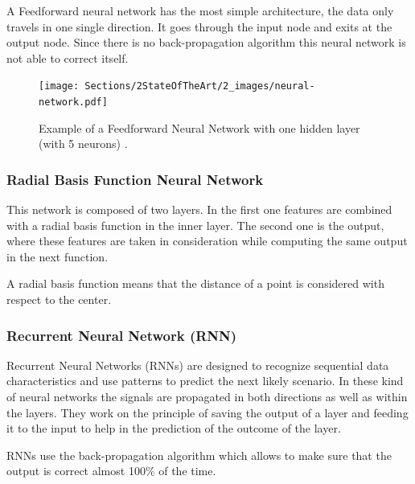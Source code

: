             \par A Feedforward neural network has the most simple architecture, the data only travels in one single direction. It goes through the input node and exits at the output node. Since there is no back-propagation algorithm this neural network is not able to correct itself. \cite{ArmaanMerchant2018} \cite{VikasGupta2017}

            \begin{figure}[htb]
                \centering
                \texttt{[image: Sections/2StateOfTheArt/2\_images/neural-network.pdf]}
                \caption{ Example of a Feedforward Neural Network with one hidden layer (with 5 neurons) \cite{neural_image}. }  
            \end{figure}

            \newpage
            \subsubsection{Radial Basis Function Neural Network}

            \par This network is composed of two layers. In the first one features are combined with a radial basis function in the inner layer. The second one is the output, where these features are taken in consideration while computing the same output in the next function.
            \par A radial basis function means that the distance of a point is considered with respect to the center. \cite{ArmaanMerchant2018}


            \subsubsection{Recurrent Neural Network (RNN)} 

            \par Recurrent Neural Networks (RNNs) are designed to recognize sequential data characteristics and use patterns to predict the next likely scenario. In these kind of neural networks the signals are propagated in both directions as well as within the layers. They work on the principle of saving the output of a layer and feeding it to the input to help in the prediction of the outcome of the layer.
            \par RNNs use the back-propagation algorithm which allows to make sure that the output is correct almost 100\% of the time. \cite{ArmaanMerchant2018}
        


